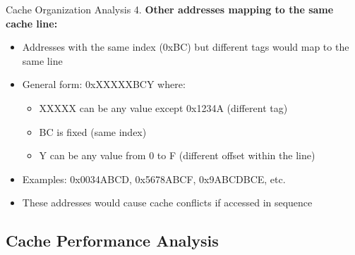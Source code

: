 \begin{example2}{Cache Organization Analysis}
4. \textbf{Other addresses mapping to the same cache line:}
   \begin{itemize}
     \item Addresses with the same index (0xBC) but different tags would map to the same line
     \item General form: 0xXXXXXBCY where:
     \begin{itemize}
       \item XXXXX can be any value except 0x1234A (different tag)
       \item BC is fixed (same index)
       \item Y can be any value from 0 to F (different offset within the line)
     \end{itemize}
     \item Examples: 0x0034ABCD, 0x5678ABCF, 0x9ABCDBCE, etc.
     \item These addresses would cause cache conflicts if accessed in sequence
   \end{itemize}
\end{example2}

\subsection{Cache Performance Analysis}

